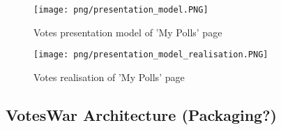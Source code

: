  
\begin{figure}
\centering
\texttt{[image: png/presentation\_model.PNG]}
\caption{Votes presentation model of 'My Polls' page}
\label{F:presentation_model}
\end{figure}

\begin{figure}
\centering
\texttt{[image: png/presentation\_model\_realisation.PNG]}
\caption{Votes realisation of 'My Polls' page}
\label{F:presentation_model_realisation}
\end{figure}

\subsection{VotesWar Architecture (Packaging?)}
